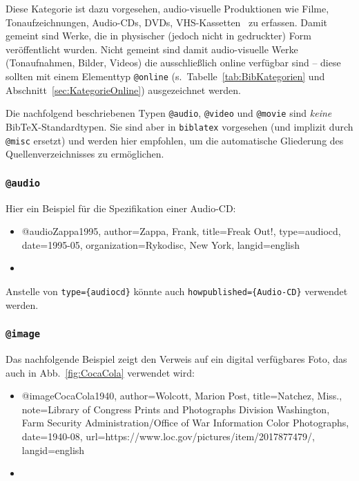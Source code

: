 Diese Kategorie ist dazu vorgesehen, audio-visuelle Produktionen wie Filme, Tonaufzeichnungen, Audio-CDs, DVDs,
VHS-Kassetten \usw\ zu erfassen. Damit gemeint sind Werke, die in physischer (jedoch nicht in gedruckter) Form
veröffentlicht wurden. Nicht gemeint sind damit audio-visuelle Werke (Tonaufnahmen, Bilder, Videos) die
ausschließlich online verfügbar sind -- diese sollten mit einem Elementtyp \texttt{@online} (s.\
Tabelle~\ref{tab:BibKategorien} und Abschnitt~\ref{sec:KategorieOnline}) ausgezeichnet werden.

Die nachfolgend beschriebenen Typen \texttt{@audio}, \texttt{@video} und \texttt{@movie} sind \emph{keine}
Bib\-TeX-Standardtypen. Sie sind aber in \texttt{biblatex} vorgesehen (und implizit durch \texttt{@misc} ersetzt) und
werden hier empfohlen, um die automatische Gliederung des Quellenverzeichnisses zu ermöglichen.


\subsubsection{\texttt{\bfseries @audio}}
\label{sec:@audio}
Hier ein Beispiel für die Spezifikation einer Audio-CD:
%
\begin{itemize}
\item[] 
\begin{GenericCode}[numbers=none]
@audio{Zappa1995,
  author={Zappa, Frank},
  title={Freak Out!},
  type={audiocd},
  date={1995-05},
  organization={Rykodisc, New York},
  langid={english}
}
\end{GenericCode}
\item[\cite{Zappa1995}] 
\end{itemize}
%
Anstelle von \verb!type={audiocd}! könnte auch \verb!howpublished={Audio-CD}! verwendet werden.


\subsubsection{\texttt{\bfseries @image}}
\label{sec:@image}

Das nachfolgende Beispiel zeigt den Verweis auf ein digital verfügbares Foto,
das auch in Abb.\ \ref{fig:CocaCola} verwendet wird:
%
\begin{itemize}
\item[] 
\begin{GenericCode}[numbers=none]
@image{CocaCola1940,
  author={Wolcott, Marion Post},
  title={Natchez, Miss.},
  note={Library of Congress Prints and Photographs Division Washington, Farm Security Administration/Office of War Information Color Photographs},
  date={1940-08},
  url={https://www.loc.gov/pictures/item/2017877479/},
  langid={english}
}
\end{GenericCode}
\item[\cite{CocaCola1940}] 
\end{itemize}



